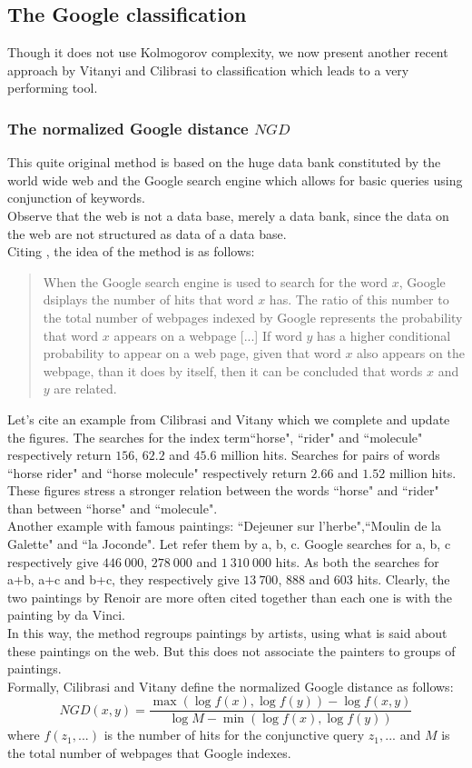 \subsection{The Google classification}
Though it does not use Kolmogorov complexity, we now present
another recent approach by Vitanyi and Cilibrasi \cite{cilibrasi07}
to classification which leads to a very performing tool.
\subsubsection{The normalized Google distance $NGD$}\label{sss:ngd}
This quite original method is based on the huge data bank
constituted by the world wide web and the Google search engine
which allows for basic queries using conjunction of keywords.
\\
Observe that the web is not a data base, merely a data bank,
since the data on the web are not structured as data of a data
base.
\medskip\\
Citing  \cite{evangelista06}, the idea of the method is as follows:
\begin{quote}
When the Google search engine is used to search for the word $x$,
Google dsiplays the number of hits that word $x$ has.
The ratio of this number to the total number of webpages indexed
by Google represents the probability that word $x$ appears on a webpage [...]
If word $y$ has a higher conditional probability to appear on a web
page, given that word $x$ also appears on the webpage, than it does
by itself, then it can be concluded that words $x$ and $y$ are
related.
\end{quote}
Let's cite an example from Cilibrasi and Vitany \cite{ciliercim05}
which we complete and update the figures.
The searches for the index term``horse", ``rider" and ``molecule"
respectively return $156$, $62.2$ and $45.6$ million hits.
Searches for pairs of words ``horse rider" and ``horse molecule"
respectively return $2.66$ and $1.52$ million hits.
These figures stress a stronger relation between the words
``horse" and ``rider" than between ``horse" and ``molecule".
\\
Another example with famous paintings:
``Dejeuner sur l'herbe",``Moulin de la Galette" and ``la Joconde".
Let refer them by a, b, c.
Google searches for a, b, c respectively give
$446~000$, $278~000$ and $1~310~000$ hits.
As both the searches for a+b, a+c and b+c, they respectively give
$13~700$, $888$ and $603$ hits. Clearly, the two paintings by Renoir
are more often cited together than each one is with the painting by
da Vinci.
\\
In this way, the method regroups paintings by artists, using what
is said about these paintings on the web.
But this does not associate the painters to groups of paintings.
\medskip\\
Formally, Cilibrasi and Vitany \cite{ciliercim05,cilibrasi07}
define the normalized Google distance as follows:
$$
NGD(x,y) =\frac{\max(\log f(x),\log f(y))-\log f(x,y)}
{\log M -\min(\log f(x),\log f(y))}
$$
where $f(z_1,...)$ is the number of hits for the conjunctive
query $z_1,...$ and $M$ is the total number of webpages that
Google indexes.
